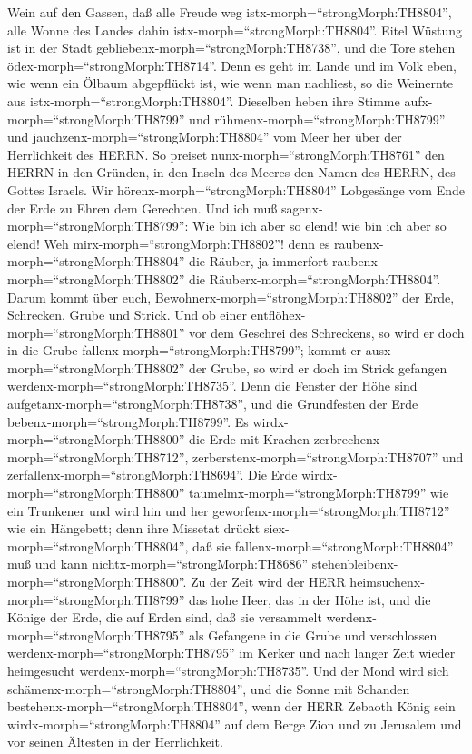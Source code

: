 Wein auf den Gassen, daß alle Freude weg
istx-morph=``strongMorph:TH8804'', alle Wonne des Landes dahin
istx-morph=``strongMorph:TH8804''.  Eitel Wüstung ist in
der Stadt gebliebenx-morph=``strongMorph:TH8738'', und die Tore stehen
ödex-morph=``strongMorph:TH8714''.  Denn es geht im Lande
und im Volk eben, wie wenn ein Ölbaum abgepflückt ist, wie wenn man
nachliest, so die Weinernte aus istx-morph=``strongMorph:TH8804''.
 Dieselben heben ihre Stimme
aufx-morph=``strongMorph:TH8799'' und
rühmenx-morph=``strongMorph:TH8799'' und
jauchzenx-morph=``strongMorph:TH8804'' vom Meer her über der
Herrlichkeit des HERRN.  So preiset
nunx-morph=``strongMorph:TH8761'' den HERRN in den Gründen, in den
Inseln des Meeres den Namen des HERRN, des Gottes Israels. 
Wir hörenx-morph=``strongMorph:TH8804'' Lobgesänge vom Ende der Erde zu
Ehren dem Gerechten. Und ich muß sagenx-morph=``strongMorph:TH8799'':
Wie bin ich aber so elend! wie bin ich aber so elend! Weh
mirx-morph=``strongMorph:TH8802''! denn es
raubenx-morph=``strongMorph:TH8804'' die Räuber, ja immerfort
raubenx-morph=``strongMorph:TH8802'' die
Räuberx-morph=``strongMorph:TH8804''.  Darum kommt über
euch, Bewohnerx-morph=``strongMorph:TH8802'' der Erde, Schrecken, Grube
und Strick.  Und ob einer
entflöhex-morph=``strongMorph:TH8801'' vor dem Geschrei des Schreckens,
so wird er doch in die Grube fallenx-morph=``strongMorph:TH8799''; kommt
er ausx-morph=``strongMorph:TH8802'' der Grube, so wird er doch im
Strick gefangen werdenx-morph=``strongMorph:TH8735''. Denn die Fenster
der Höhe sind aufgetanx-morph=``strongMorph:TH8738'', und die
Grundfesten der Erde bebenx-morph=``strongMorph:TH8799''. 
Es wirdx-morph=``strongMorph:TH8800'' die Erde mit Krachen
zerbrechenx-morph=``strongMorph:TH8712'',
zerberstenx-morph=``strongMorph:TH8707'' und
zerfallenx-morph=``strongMorph:TH8694''.  Die Erde
wirdx-morph=``strongMorph:TH8800'' taumelmx-morph=``strongMorph:TH8799''
wie ein Trunkener und wird hin und her
geworfenx-morph=``strongMorph:TH8712'' wie ein Hängebett; denn ihre
Missetat drückt siex-morph=``strongMorph:TH8804'', daß sie
fallenx-morph=``strongMorph:TH8804'' muß und kann
nichtx-morph=``strongMorph:TH8686''
stehenbleibenx-morph=``strongMorph:TH8800''.  Zu der Zeit
wird der HERR heimsuchenx-morph=``strongMorph:TH8799'' das hohe Heer,
das in der Höhe ist, und die Könige der Erde, die auf Erden sind,
 daß sie versammelt werdenx-morph=``strongMorph:TH8795''
als Gefangene in die Grube und verschlossen
werdenx-morph=``strongMorph:TH8795'' im Kerker und nach langer Zeit
wieder heimgesucht werdenx-morph=``strongMorph:TH8735''. 
Und der Mond wird sich schämenx-morph=``strongMorph:TH8804'', und die
Sonne mit Schanden bestehenx-morph=``strongMorph:TH8804'', wenn der HERR
Zebaoth König sein wirdx-morph=``strongMorph:TH8804'' auf dem Berge Zion
und zu Jerusalem und vor seinen Ältesten in der Herrlichkeit.

